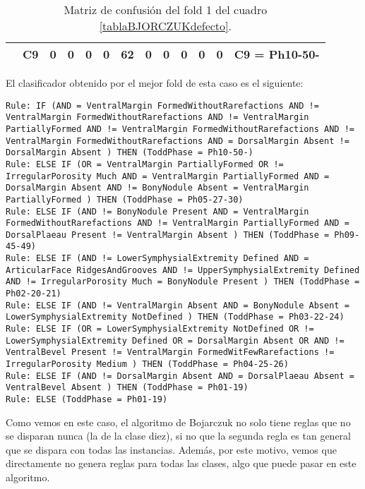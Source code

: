 \begin{table}[H]
{\begin{tabular}{|ccccccccccccc|}
\multicolumn{1}{|c|}{}                                      & \multicolumn{1}{c|}{C9} & \multicolumn{1}{c|}{0}  & \multicolumn{1}{c|}{0}  & \multicolumn{1}{c|}{0}  & \multicolumn{1}{c|}{0}  & \multicolumn{1}{c|}{\textbf{62}}  & \multicolumn{1}{c|}{0}  & \multicolumn{1}{c|}{0}  & \multicolumn{1}{c|}{0}  & \multicolumn{1}{c|}{0}  & \multicolumn{1}{c|}{0} & C9 = Ph10-50-     \\ \hline
\end{tabular}%
}
\caption{Matriz de confusión del fold 1 del cuadro \ref{tablaBJORCZUKdefecto}.}
\end{table}



El clasificador obtenido por el mejor fold de esta caso es el siguiente:

\begin{lstlisting}
Rule: IF (AND = VentralMargin FormedWithoutRarefactions AND != VentralMargin FormedWithoutRarefactions AND != VentralMargin PartiallyFormed AND != VentralMargin FormedWithoutRarefactions AND != VentralMargin FormedWithoutRarefactions AND = DorsalMargin Absent != DorsalMargin Absent ) THEN (ToddPhase = Ph10-50-)
Rule: ELSE IF (OR = VentralMargin PartiallyFormed OR != IrregularPorosity Much AND = VentralMargin PartiallyFormed AND = DorsalMargin Absent AND != BonyNodule Absent = VentralMargin PartiallyFormed ) THEN (ToddPhase = Ph05-27-30)
Rule: ELSE IF (AND != BonyNodule Present AND = VentralMargin FormedWithoutRarefactions AND != VentralMargin PartiallyFormed AND = DorsalPlaeau Present != VentralMargin Absent ) THEN (ToddPhase = Ph09-45-49)
Rule: ELSE IF (AND != LowerSymphysialExtremity Defined AND = ArticularFace RidgesAndGrooves AND != UpperSymphysialExtremity Defined AND != IrregularPorosity Much = BonyNodule Present ) THEN (ToddPhase = Ph02-20-21)
Rule: ELSE IF (AND != VentralMargin Absent AND = BonyNodule Absent = LowerSymphysialExtremity NotDefined ) THEN (ToddPhase = Ph03-22-24)
Rule: ELSE IF (OR = LowerSymphysialExtremity NotDefined OR != LowerSymphysialExtremity Defined OR = DorsalMargin Absent OR AND != VentralBevel Present != VentralMargin FormedWitFewRarefactions != IrregularPorosity Medium ) THEN (ToddPhase = Ph04-25-26)
Rule: ELSE IF (AND != DorsalMargin Absent AND = DorsalPlaeau Absent = VentralBevel Absent ) THEN (ToddPhase = Ph01-19)
Rule: ELSE (ToddPhase = Ph01-19)
\end{lstlisting}

Como vemos en este caso, el algoritmo de Bojarczuk no solo tiene reglas que no se disparan nunca (la de la clase diez), si no que la segunda regla es tan general que se dispara con todas las instancias. Además, por este motivo, vemos que directamente no genera reglas para todas las clases, algo que puede pasar en este algoritmo.

